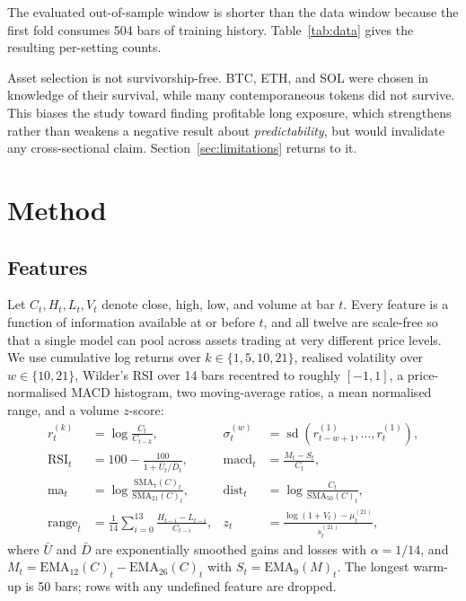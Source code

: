 \documentclass{article}
\theoremstyle{plain}
\theoremstyle{definition}
\begin{document}
The evaluated out-of-sample window is shorter than the data window because the
first fold consumes 504 bars of training history. Table~\ref{tab:data} gives the
resulting per-setting counts.

\begin{table}[t]
  \centering
  \caption{Evaluated out-of-sample window per setting. Counts are forecasts, not
  trades; the trading rule of Section~\ref{sec:strategy} samples every $h$-th bar.}
  \label{tab:data}
  \small
  
\end{table}

Asset selection is not survivorship-free. BTC, ETH, and SOL were chosen in
knowledge of their survival, while many contemporaneous tokens did not survive.
This biases the study toward finding profitable long exposure, which strengthens
rather than weakens a negative result about \emph{predictability}, but would
invalidate any cross-sectional claim. Section~\ref{sec:limitations} returns to it.

\section{Method}

\subsection{Features}

Let $C_t, H_t, L_t, V_t$ denote close, high, low, and volume at bar $t$. Every
feature is a function of information available at or before $t$, and all twelve
are scale-free so that a single model can pool across assets trading at very
different price levels. We use cumulative log returns over
$k \in \{1,5,10,21\}$, realised volatility over $w \in \{10,21\}$, Wilder's RSI
over 14 bars recentred to roughly $[-1,1]$, a price-normalised MACD histogram,
two moving-average ratios, a mean normalised range, and a volume $z$-score:
%
\begin{align}
  r_t^{(k)} &= \log \frac{C_t}{C_{t-k}},
  &
  \sigma_t^{(w)} &= \operatorname{sd}\!\left(r_{t-w+1}^{(1)}, \dots, r_t^{(1)}\right),
  \\[2pt]
  \mathrm{RSI}_t &= 100 - \frac{100}{1 + \bar{U}_t / \bar{D}_t},
  &
  \mathrm{macd}_t &= \frac{M_t - S_t}{C_t},
  \\[2pt]
  \mathrm{ma}_t &= \log \frac{\mathrm{SMA}_7(C)_t}{\mathrm{SMA}_{21}(C)_t},
  &
  \mathrm{dist}_t &= \log \frac{C_t}{\mathrm{SMA}_{50}(C)_t},
  \\[2pt]
  \mathrm{range}_t &= \frac{1}{14}\sum_{i=0}^{13} \frac{H_{t-i} - L_{t-i}}{C_{t-i}},
  &
  z_t &= \frac{\log(1+V_t) - \mu_t^{(21)}}{s_t^{(21)}},
\end{align}
%
where $\bar U$ and $\bar D$ are exponentially smoothed gains and losses with
$\alpha = 1/14$, and $M_t = \mathrm{EMA}_{12}(C)_t - \mathrm{EMA}_{26}(C)_t$ with
$S_t = \mathrm{EMA}_9(M)_t$. The longest warm-up is 50 bars; rows with any
undefined feature are dropped.
\end{document}
